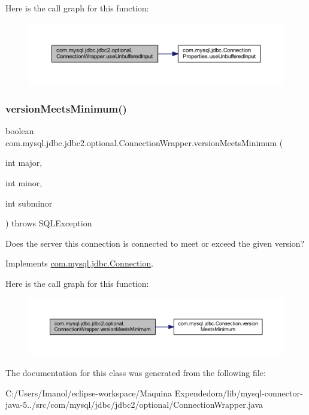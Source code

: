 Here is the call graph for this function\+:
\nopagebreak
\begin{figure}[H]
\begin{center}
\leavevmode
\includegraphics[width=350pt]{classcom_1_1mysql_1_1jdbc_1_1jdbc2_1_1optional_1_1_connection_wrapper_ae90cf2a8ef9234c774cf9567b48f755f_cgraph}
\end{center}
\end{figure}
\mbox{\label{classcom_1_1mysql_1_1jdbc_1_1jdbc2_1_1optional_1_1_connection_wrapper_aa9d07d33f8163adfb5783228d7a86788}} 
\subsubsection{\texorpdfstring{version\+Meets\+Minimum()}{versionMeetsMinimum()}}
{\footnotesize\ttfamily boolean com.\+mysql.\+jdbc.\+jdbc2.\+optional.\+Connection\+Wrapper.\+version\+Meets\+Minimum (\begin{DoxyParamCaption}\item[{int}]{major,  }\item[{int}]{minor,  }\item[{int}]{subminor }\end{DoxyParamCaption}) throws S\+Q\+L\+Exception}

Does the server this connection is connected to meet or exceed the given version? 

Implements \mbox{\hyperlink{interfacecom_1_1mysql_1_1jdbc_1_1_connection_af05f0b2545de1a6a1ca7d41f467516d3}{com.\+mysql.\+jdbc.\+Connection}}.

Here is the call graph for this function\+:
\nopagebreak
\begin{figure}[H]
\begin{center}
\leavevmode
\includegraphics[width=350pt]{classcom_1_1mysql_1_1jdbc_1_1jdbc2_1_1optional_1_1_connection_wrapper_aa9d07d33f8163adfb5783228d7a86788_cgraph}
\end{center}
\end{figure}


The documentation for this class was generated from the following file\+:\begin{DoxyCompactItemize}
\item 
C\+:/\+Users/\+Imanol/eclipse-\/workspace/\+Maquina Expendedora/lib/mysql-\/connector-\/java-\/5../src/com/mysql/jdbc/jdbc2/optional/Connection\+Wrapper.\+java\end{DoxyCompactItemize}
